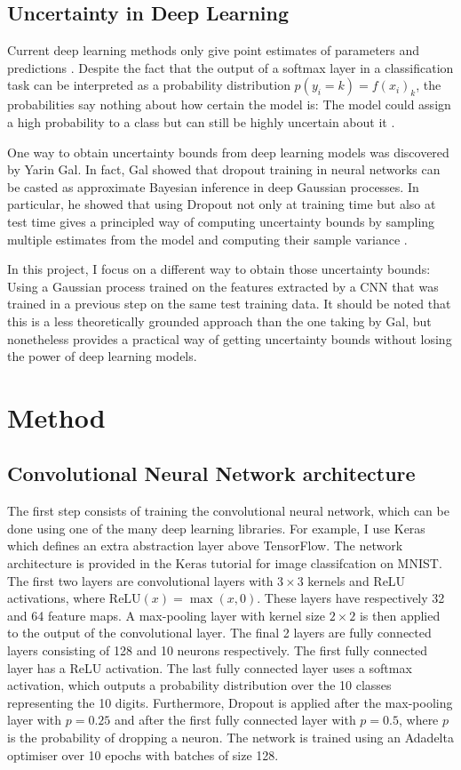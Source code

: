 \documentclass{article}
\begin{document}
\subsection{Uncertainty in Deep Learning}
Current deep learning methods only give point estimates of parameters and predictions \cite{Goodfellow-et-al-2016}. Despite the fact that the output of a softmax layer in a classification task can be interpreted as a probability distribution $p(y_i = k) = f(x_i)_k$, the probabilities say nothing about how certain the model is: The model could assign a high probability to a class but can still be highly uncertain about it \cite{gal2016dropout}. 

One way to obtain uncertainty bounds from deep learning models was discovered by Yarin Gal. In fact, Gal \cite{Gal2016Uncertainty} showed that dropout training in neural networks can be casted as approximate Bayesian inference in deep Gaussian processes. In particular, he showed that using Dropout not only at training time but also at test time gives a principled way of computing uncertainty bounds by sampling multiple estimates from the model and computing their sample variance \cite{Gal2016Uncertainty}.

In this project, I focus on a different way to obtain those uncertainty bounds: Using a Gaussian process trained on the features extracted by a CNN that was trained in a previous step on the same test training data. It should be noted that this is a less theoretically grounded approach than the one taking by Gal, but nonetheless provides a practical way of getting uncertainty bounds without losing the power of deep learning models. 

\section{Method}
\subsection{Convolutional Neural Network architecture}
The first step consists of training the convolutional neural network, which can be done using one of the many deep learning libraries. For example, I use Keras \cite{chollet2015keras} which defines an extra abstraction layer above TensorFlow. The network architecture is provided in the Keras tutorial for image classifcation on MNIST. The first two layers are convolutional layers with $3 \times 3$ kernels and ReLU activations, where $\textrm{ReLU}(x) = \max(x, 0)$. These layers have respectively 32 and 64 feature maps. A max-pooling layer with kernel size $2 \times 2$ is then applied to the output of the convolutional layer. The final 2 layers are fully connected layers consisting of 128 and 10 neurons respectively. The first fully connected layer has a ReLU activation. The last fully connected layer uses a softmax activation, which outputs a probability distribution over the 10 classes representing the 10 digits. Furthermore, Dropout \cite{srivastava2014dropout} is applied after the max-pooling layer with $p=0.25$ and after the first fully connected layer with $p=0.5$, where $p$ is the probability of dropping a neuron. The network is trained using an Adadelta optimiser over 10 epochs with batches of size 128.
\end{document}
